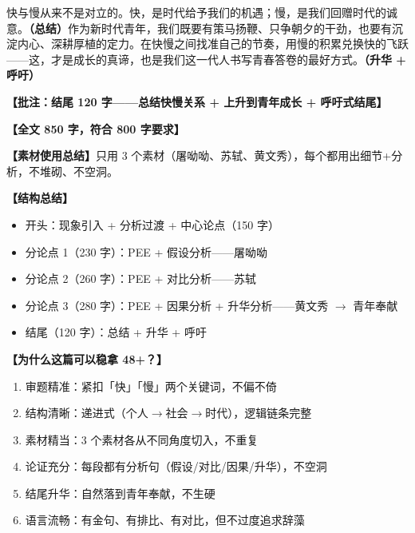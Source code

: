 快与慢从来不是对立的。快，是时代给予我们的机遇；慢，是我们回赠时代的诚意。\textbf{（总结）}作为新时代青年，我们既要有策马扬鞭、只争朝夕的干劲，也要有沉淀内心、深耕厚植的定力。在快慢之间找准自己的节奏，用慢的积累兑换快的飞跃——这，才是成长的真谛，也是我们这一代人书写青春答卷的最好方式。\textbf{（升华 + 呼吁）}

\textbf{【批注：结尾 120 字——总结快慢关系 + 上升到青年成长 + 呼吁式结尾】}

\textbf{【全文 850 字，符合 800 字要求】}

\textbf{【素材使用总结】}只用 3 个素材（屠呦呦、苏轼、黄文秀），每个都用出细节+分析，不堆砌、不空洞。

\textbf{【结构总结】}
\begin{itemize}
  \item 开头：现象引入 + 分析过渡 + 中心论点（150 字）
  \item 分论点 1（230 字）：PEE + 假设分析——屠呦呦
  \item 分论点 2（260 字）：PEE + 对比分析——苏轼
  \item 分论点 3（280 字）：PEE + 因果分析 + 升华分析——黄文秀 $\to$ 青年奉献
  \item 结尾（120 字）：总结 + 升华 + 呼吁
\end{itemize}

\textbf{【为什么这篇可以稳拿 48+？】}
\begin{enumerate}
  \item 审题精准：紧扣「快」「慢」两个关键词，不偏不倚
  \item 结构清晰：递进式（个人$\to$社会$\to$时代），逻辑链条完整
  \item 素材精当：3 个素材各从不同角度切入，不重复
  \item 论证充分：每段都有分析句（假设/对比/因果/升华），不空洞
  \item 结尾升华：自然落到青年奉献，不生硬
  \item 语言流畅：有金句、有排比、有对比，但不过度追求辞藻
\end{enumerate}
